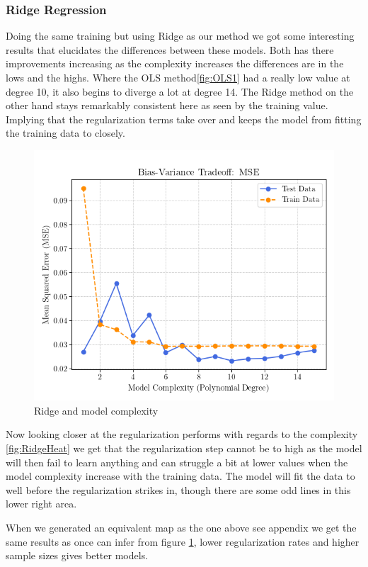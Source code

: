 \documentclass[amssymb,twocolumn,aps]{revtex4}
\begin{document}
\subsubsection{Ridge Regression}
Doing the same training but using Ridge as our method we got some interesting results that elucidates the differences between these models.
Both has there improvements increasing as the complexity increases the differences are in the lows and the highs.
Where the OLS method\ref{fig:OLS1} had a really low value at degree 10, it also begins to diverge a lot at degree 14.
The Ridge method on the other hand stays remarkably consistent here as seen by the training value. 
Implying that the regularization terms take over and keeps the model from fitting the training data to closely. 

\begin{figure}[h]
    \centering
    \includegraphics[width=.95 \linewidth]{Figures/MSE_RidgeOnly.png}
    \caption{Ridge and model complexity}
    \label{fig:RidgeMse}
\end{figure}

Now looking closer at the regularization performs with regards to the complexity \ref{fig:RidgeHeat} we get that the regularization step cannot be to high as the model will then fail to learn anything and can struggle a bit at lower values when the model complexity increase with the training data.
The model will fit the data to well before the regularization strikes in, though there are some odd lines in this lower right area.

When we generated an equivalent map as the one above see appendix we get the same results as once can infer from figure \ref{fig:RidgeMse}, lower regularization rates and higher sample sizes gives better models.
\end{document}

